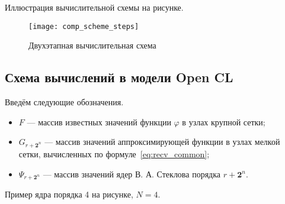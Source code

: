 

Иллюстрация вычислительной схемы на рисунке.
\begin{figure}[h!]
  \centering
  \texttt{[image: comp\_scheme\_steps]} 
  \caption{Двухэтапная вычислительная схема}
  \label{fig:reg_net}
\end{figure}
\FloatBarrier

\subsection*{Схема вычислений в модели Open CL}


Введём  следующие обозначения.
\begin{itemize}

\item
  $F$  --- массив  известных значений функции $\varphi$
  в узлах крупной сетки;

\item
  $G_{r+\mathbf{2}^n}$ --- массив
  значений аппроксимирующей функции в узлах мелкой сетки,
  вычисленных по формуле~\eqref{eq:recv_common};

\item
  $\Psi_{r+\mathbf{2}^n}$ --- массив  значений ядер В. А. Стеклова порядка $r+\mathbf{2}^n$.

\end{itemize}




Пример ядра порядка 4 на рисунке, $N=4$.

